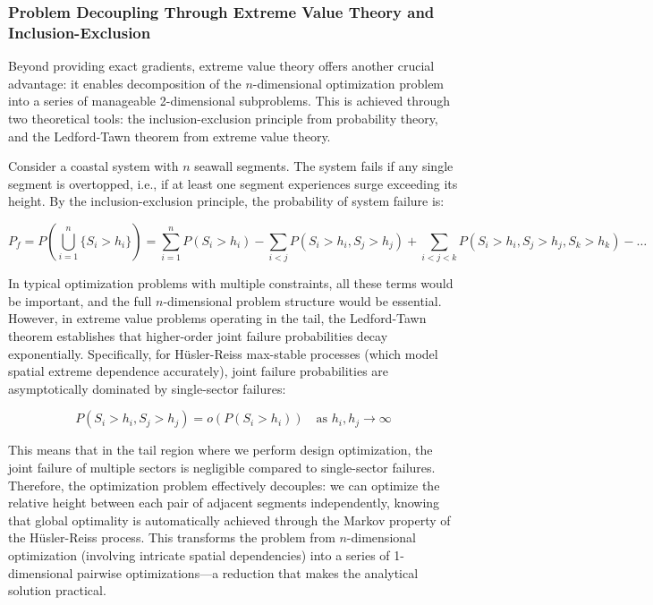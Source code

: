 \documentclass[review]{elsarticle}
\begin{document}
\subsubsection{Problem Decoupling Through Extreme Value Theory and Inclusion-Exclusion}

Beyond providing exact gradients, extreme value theory offers another crucial advantage: it enables decomposition of the $n$-dimensional optimization problem into a series of manageable 2-dimensional subproblems. This is achieved through two theoretical tools: the inclusion-exclusion principle from probability theory, and the Ledford-Tawn theorem from extreme value theory.

Consider a coastal system with $n$ seawall segments. The system fails if any single segment is overtopped, i.e., if at least one segment experiences surge exceeding its height. By the inclusion-exclusion principle, the probability of system failure is:

\begin{equation}
P_f = P\left(\bigcup_{i=1}^{n} \{S_i > h_i\}\right) = \sum_{i=1}^{n} P(S_i > h_i) - \sum_{i<j} P(S_i > h_i, S_j > h_j) + \sum_{i<j<k} P(S_i > h_i, S_j > h_j, S_k > h_k) - \ldots
\end{equation}

In typical optimization problems with multiple constraints, all these terms would be important, and the full $n$-dimensional problem structure would be essential. However, in extreme value problems operating in the tail, the Ledford-Tawn theorem \cite{ledford1997statistics} establishes that higher-order joint failure probabilities decay exponentially. Specifically, for Hüsler-Reiss max-stable processes (which model spatial extreme dependence accurately), joint failure probabilities are asymptotically dominated by single-sector failures:

\begin{equation}
P(S_i > h_i, S_j > h_j) = o(P(S_i > h_i)) \quad \text{as } h_i, h_j \to \infty
\end{equation}

This means that in the tail region where we perform design optimization, the joint failure of multiple sectors is negligible compared to single-sector failures. Therefore, the optimization problem effectively decouples: we can optimize the relative height between each pair of adjacent segments independently, knowing that global optimality is automatically achieved through the Markov property of the Hüsler-Reiss process. This transforms the problem from $n$-dimensional optimization (involving intricate spatial dependencies) into a series of 1-dimensional pairwise optimizations---a reduction that makes the analytical solution practical.
\end{document}
